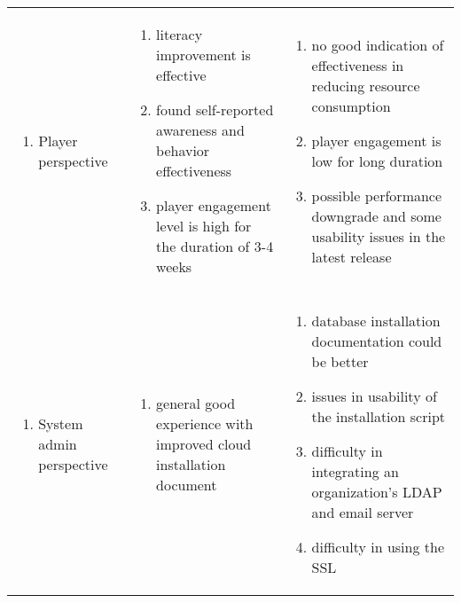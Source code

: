 \begin{table}[ht!]
  \centering
  \begin{tabular}{|P{0.17\columnwidth}|P{0.36\columnwidth}|P{0.36\columnwidth}|}
    \hline
     &
     &
     \\
    \hline
    \begin{enumerate}[label={}, nosep, leftmargin=*]
    \item Player perspective 
    \end{enumerate}
    & 
    \setlength{\topmargin}{0pt}
    \begin{enumerate}[nosep, leftmargin=*]
    \item literacy improvement is effective 
    \item found self-reported awareness and behavior effectiveness 
    \item player engagement level is high for the duration of 3-4 weeks
    \end{enumerate}               
    &  
    \begin{enumerate}[nosep, leftmargin=*]
     \item no good indication of effectiveness in reducing resource consumption
     \item player engagement is low for long duration 
     \item possible performance downgrade and some usability issues in the latest release
     \end{enumerate}  \\
    \hline
    \begin{enumerate}[label={}, nosep, leftmargin=*]
    \item System admin perspective 
    \end{enumerate}
    & 
    \begin{enumerate}[label={}, nosep, leftmargin=*]
    \item general good experience with improved cloud installation document 
    \end{enumerate}               
    &
    \begin{enumerate}[nosep, leftmargin=*]
    \item database installation documentation could be better
    \item issues in usability of the installation script
    \item difficulty in integrating an organization's LDAP and email server
    \item difficulty in using the SSL

\end{enumerate}
\end{tabular}
\end{table}
